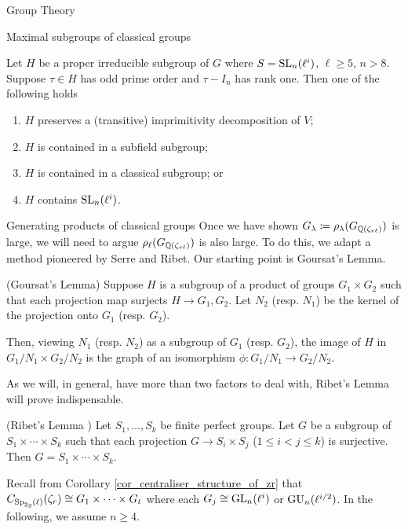 \documentclass[11pt,a4paper]{article}
\newcommand{\GQrl}{G_{\QQ(\zeta_{r\ell})}}
\newcommand{\zr}{\zeta_r}
\newcommand{\Glam}{G_{\lambda}}
\begin{document}
\begin{section}{Group Theory}
\begin{subsection}{Maximal subgroups of classical groups}
\begin{theorem}
\label{thm_maximal_sbgps_GL}
Let $H$ be a proper irreducible subgroup of $G$ where $S = \SL_n(\ell^i)$, $\ell \geq 5$, $n > 8$. Suppose $\tau \in H$ has odd prime order and $\tau-I_n$ has rank one. Then one of the following holds
\begin{enumerate}
    \item $H$ preserves a (transitive) imprimitivity decomposition of $V$;
    \item $H$ is contained in a subfield subgroup; 
    \item $H$ is contained in a classical subgroup; or
    \item $H$ contains $\SL_n(\ell^i)$.
\end{enumerate}
\end{theorem}
\end{subsection}
\begin{subsection}{Generating products of classical groups}
\label{subsection_products_of_classical_groups}
Once we have shown $\Glam \coloneqq \rho_\lambda(\GQrl)$ is large, we will need to argue $\rho_\ell(\GQrl)$ is also large. To do this, we adapt a method pioneered by Serre and Ribet.
Our starting point is Goursat's Lemma. 

\begin{lemma}(Goursat's Lemma)
Suppose $H$ is a subgroup of a product of groups $G_1\times G_2$ such that each projection map surjects $H \rightarrow G_1,G_2$. Let $N_2$ (resp. $N_1$) be the kernel of the projection onto $G_1$ (resp. $G_2$).

Then, viewing $N_1$ (resp. $N_2$) as a subgroup of $G_1$ (resp. $G_2$), the image of $H$ in $G_1/N_1 \times G_2/N_2$ is the graph of an isomorphism $\phi\colon G_1/N_1 \rightarrow G_2/N_2$.
\end{lemma}

As we will, in general, have more than two factors to deal with, Ribet's Lemma will prove indispensable.

\begin{lemma}(Ribet's Lemma \cite[Lemma 5.2.1]{ribet_RM})
\label{ribet's_lemma}
Let $S_1, \ldots,S_k$ be finite perfect groups. Let $G$ be a subgroup of $S_1 \times \cdots \times S_k$ such that each projection $G \rightarrow S_i \times S_j$ ($1 \leq i<j\leq k$) is surjective. Then $G=S_1 \times \cdots \times S_k $.
\end{lemma}



Recall from Corollary \ref{cor_centraliser_structure_of_zr} that $C_{\Sp_{2g}(\ell)}(\zr) \cong G_1 \times \cdots\times  G_t$ where each $G_j \cong \GL_n(\ell^i)$ or $\GU_n(\ell^{i/2})$. In the following, we assume $n\geq 4$. %


\end{subsection}
\end{section}
\end{document}
